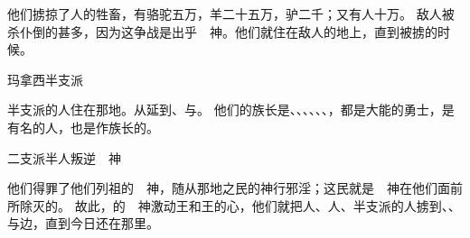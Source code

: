 {他们掳掠了{}人的牲畜，有骆驼五万，羊二十五万，驴二千；又有人十万。
敌人被杀仆倒的甚多，因为这争战是出乎　神。他们就住在敌人的地上，直到被掳的时候。
\par }{\SH 玛拿西半支派
\par }{\PP {}半支派的人住在那地。从{}延到{}、{}与{}。
他们的族长是{}、{}、{}、{}、{}、{}、{}，都是大能的勇士，是有名的人，也是作族长的。
\par }{\SH 二支派半人叛逆　神
\par }{\PP {}他们得罪了他们列祖的　神，随从那地之民的神行邪淫；这民就是　神在他们面前所除灭的。
故此，{}的　神激动{}王{}和{}王{}的心，他们就把{}人、{}人、{}半支派的人掳到{}、{}、{}与{}边，直到今日还在那里。

}
